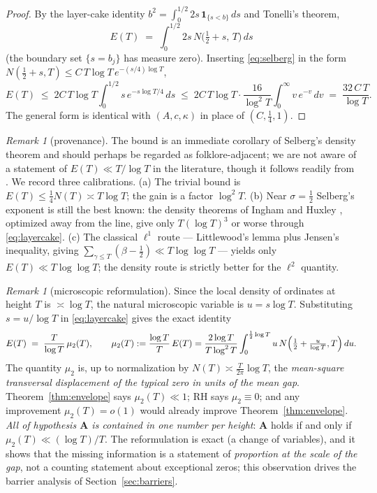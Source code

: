 \documentclass[11pt]{amsart}
\theoremstyle{plain}
\theoremstyle{definition}
\theoremstyle{remark}
\newtheorem{remark}[theorem]{Remark}
\newcommand{\RH}{\mathrm{RH}}
\newcommand{\Aax}{\mathbf{A}}
\begin{document}
\begin{proof}
By the layer-cake identity $b^2=\int_0^{1/2}2s\,\mathbf 1_{\{s<b\}}\,ds$ and Tonelli's theorem,
\begin{equation}\label{eq:layercake}
E(T)\;=\;\int_0^{1/2} 2s\,N\bigl(\tfrac12+s,\,T\bigr)\,ds
\end{equation}
(the boundary set $\{s=b_j\}$ has measure zero). Inserting \eqref{eq:selberg} in the form $N(\tfrac12+s,T)\le C\,T\log T\,e^{-(s/4)\log T}$,
\[
E(T)\;\le\;2C\,T\log T\int_0^{1/2}s\,e^{-s\log T/4}\,ds
\;\le\;2C\,T\log T\cdot\frac{16}{\log^2 T}\int_0^\infty v\,e^{-v}\,dv
\;=\;\frac{32\,C\,T}{\log T}.
\]
The general form is identical with $(A,c,\kappa)$ in place of $(C,\tfrac14,1)$.
\end{proof}

\begin{remark}[provenance]\label{rem:folklore}
The bound is an immediate corollary of Selberg's density theorem and should perhaps be regarded as folklore-adjacent; we are not aware of a statement of $E(T)\ll T/\log T$ in the literature, though it follows readily from \cite{Selberg1946}. We record three calibrations. (a) The trivial bound is $E(T)\le\tfrac14 N(T)\asymp T\log T$; the gain is a factor $\log^2T$. (b) Near $\sigma=\tfrac12$ Selberg's exponent is still the best known: the density theorems of Ingham \cite{Ingham1940} and Huxley \cite{Huxley1972}, optimized away from the line, give only $T(\log T)^{3}$ or worse through \eqref{eq:layercake}. (c) The classical $\ell^1$ route --- Littlewood's lemma plus Jensen's inequality, giving $\sum_{\gamma\le T}(\beta-\tfrac12)\ll T\log\log T$ \cite{Littlewood1924,Titchmarsh1986} --- yields only $E(T)\ll T\log\log T$; the density route is strictly better for the $\ell^2$ quantity.
\end{remark}

\begin{remark}[microscopic reformulation]\label{rem:mu2}
Since the local density of ordinates at height $T$ is $\asymp\log T$, the natural microscopic variable is $u=s\log T$. Substituting $s=u/\log T$ in \eqref{eq:layercake} gives the exact identity
\begin{equation}\label{eq:mu2}
E(T)\;=\;\frac{T}{\log T}\,\mu_2(T),
\qquad
\mu_2(T):=\frac{\log T}{T}\,E(T)
=\frac{2\log T}{T\log^2 T}\int_0^{\frac12\log T}u\,N\Bigl(\tfrac12+\tfrac{u}{\log T},T\Bigr)\,du .
\end{equation}
The quantity $\mu_2$ is, up to normalization by $N(T)\asymp\frac{T}{2\pi}\log T$, the \emph{mean-square transversal displacement of the typical zero in units of the mean gap}. Theorem~\ref{thm:envelope} says $\mu_2(T)\ll 1$; $\RH$ says $\mu_2\equiv0$; and any improvement $\mu_2(T)=o(1)$ would already improve Theorem~\ref{thm:envelope}. \emph{All of hypothesis $\Aax$ is contained in one number per height}: $\Aax$ holds if and only if $\mu_2(T)\ll(\log T)/T$. The reformulation is exact (a change of variables), and it shows that the missing information is a statement of \emph{proportion at the scale of the gap}, not a counting statement about exceptional zeros; this observation drives the barrier analysis of Section~\ref{sec:barriers}.
\end{remark}
\end{document}
